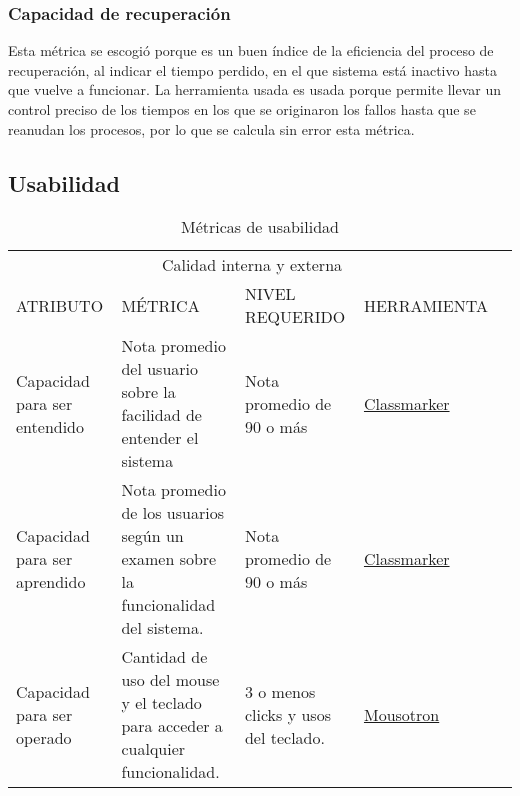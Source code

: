 \documentclass[12pt]{article}
\begin{document}
\subsubsection{Capacidad de recuperación}
\vspace*{0.1in}
Esta métrica se escogió porque es un buen índice de la eficiencia del proceso de recuperación, al indicar el tiempo perdido, en el que sistema está inactivo hasta que vuelve a funcionar.  La herramienta usada es usada porque permite llevar un control preciso de los tiempos en los que se originaron los fallos hasta que se reanudan los procesos, por lo que se calcula sin error esta métrica.\\[100 cm]

\vspace*{0.3in}

\subsection{Usabilidad}%

\begin{table}[htb]%
\centering
\begin{tabular}{|p{4cm}|p{4cm}|p{4cm}|p{4cm}|p{4cm}|}
\hline
\multicolumn{4}{|c|}{Calidad interna y externa   } \\
\cline{1-4}
ATRIBUTO & MÉTRICA & NIVEL REQUERIDO & HERRAMIENTA\\
\hline \hline
Capacidad para ser entendido 
& Nota promedio del usuario sobre la facilidad de entender el sistema
& Nota promedio de 90 o más
& \href{www.classmarker.com}{Classmarker} \\ \cline{1-4}
\hline
Capacidad para ser aprendido 
& Nota promedio de los usuarios según un examen sobre la funcionalidad del sistema.
& Nota promedio de 90 o más
& \href{www.classmarker.com}{Classmarker} \\ \cline{1-4}
\hline
Capacidad para ser operado
& Cantidad de uso del mouse y el teclado para acceder a cualquier funcionalidad. 
& 3 o menos clicks y usos del teclado. 
& \href{www.blacksunsoftware.com/mousotron.html}{Mousotron}  \\ \cline{1-4}
\hline
\end{tabular}
\caption{Métricas de usabilidad}
\label{tabla:final}
\end{table}%

\vspace*{0.3in}
\end{document}

